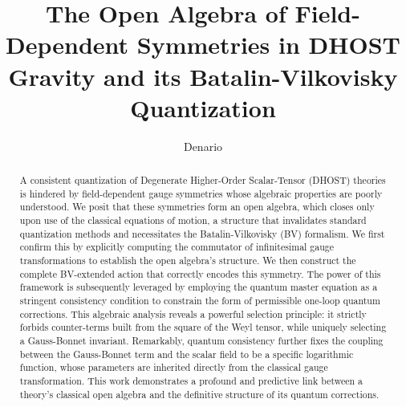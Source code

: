 \documentclass[twocolumn]{aastex631}
\begin{document}
\title{The Open Algebra of Field-Dependent Symmetries in DHOST Gravity and its Batalin-Vilkovisky Quantization}

\author{Denario}

\begin{abstract}
A consistent quantization of Degenerate Higher-Order Scalar-Tensor (DHOST) theories is hindered by field-dependent gauge symmetries whose algebraic properties are poorly understood. We posit that these symmetries form an open algebra, which closes only upon use of the classical equations of motion, a structure that invalidates standard quantization methods and necessitates the Batalin-Vilkovisky (BV) formalism. We first confirm this by explicitly computing the commutator of infinitesimal gauge transformations to establish the open algebra's structure. We then construct the complete BV-extended action that correctly encodes this symmetry. The power of this framework is subsequently leveraged by employing the quantum master equation as a stringent consistency condition to constrain the form of permissible one-loop quantum corrections. This algebraic analysis reveals a powerful selection principle: it strictly forbids counter-terms built from the square of the Weyl tensor, while uniquely selecting a Gauss-Bonnet invariant. Remarkably, quantum consistency further fixes the coupling between the Gauss-Bonnet term and the scalar field to be a specific logarithmic function, whose parameters are inherited directly from the classical gauge transformation. This work demonstrates a profound and predictive link between a theory's classical open algebra and the definitive structure of its quantum corrections.
\end{abstract}

\end{document}

